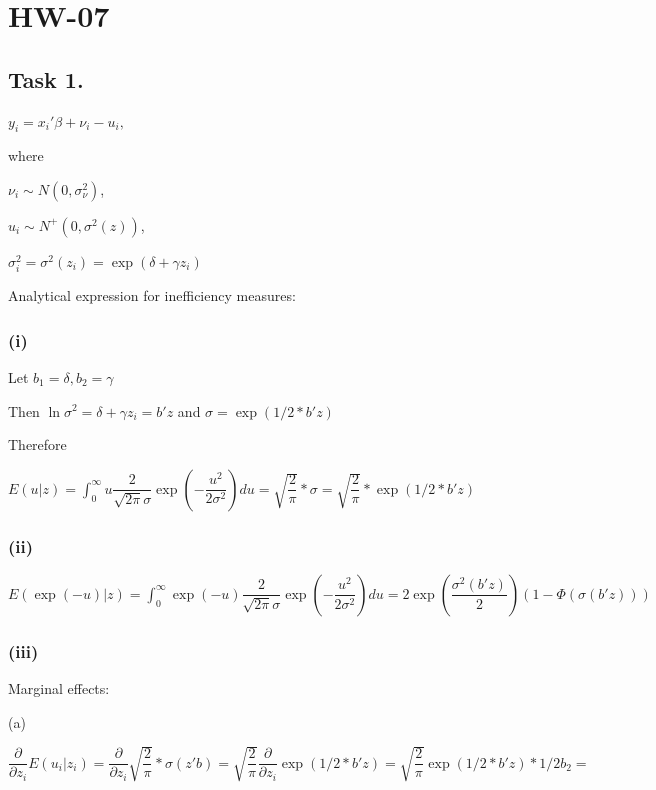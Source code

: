 \documentclass[12pt,a4paper, oneside]{extreport}
\begin{document}



\chapter*{HW-07}

\section*{Task 1.}

$y_i = x_i'\beta + \nu_i - u_i,$

where 

$\nu_i \sim N(0,\sigma^2_{\nu})$,  

$u_i \sim N^+(0,\sigma^2(z))$,


$\sigma_i^2 = \sigma^2(z_i) = \exp(\delta + \gamma z_i) $


Analytical expression for inefficiency measures:

\subsection*{(i)}

Let $b_1 = \delta,  b_2 = \gamma$

Then $\ln \sigma^2   = \delta + \gamma z_i  = b'z $ and $\sigma =  \exp(1/2 * b'z) $

Therefore 

$E(u|z) = \int_0^{\infty} u \dfrac{2}{\sqrt{2\pi} \sigma} \exp(-\dfrac{u^2}{2\sigma^2} ) du    = \sqrt{\dfrac{2}{\pi}} * \sigma = \sqrt{\dfrac{2}{\pi}} * \exp(1/2 * b'z)  $

\subsection*{(ii)}

$E(\exp(-u)|z) = \int_0^{\infty} \exp(-u) \dfrac{2}{\sqrt{2\pi} \sigma} \exp(-\dfrac{u^2}{2\sigma^2} ) du    = 2 \exp(\dfrac{\sigma^2(b'z)}{2}) (1-\Phi (\sigma(b'z))    )  $


\subsection*{(iii)}

Marginal effects: 

(a)

$\dfrac{\partial}{\partial z_i } E(u_i|z_i) = \dfrac{\partial}{\partial z_i } \sqrt{\dfrac{2}{\pi}} * \sigma(z'b) =  \sqrt{\dfrac{2}{\pi}} \dfrac{\partial}{\partial z_i }  \exp(1/2 * b'z) =   \sqrt{\dfrac{2}{\pi}} \exp(1/2 * b'z) * 1/2 b_2   = $
\end{document}
